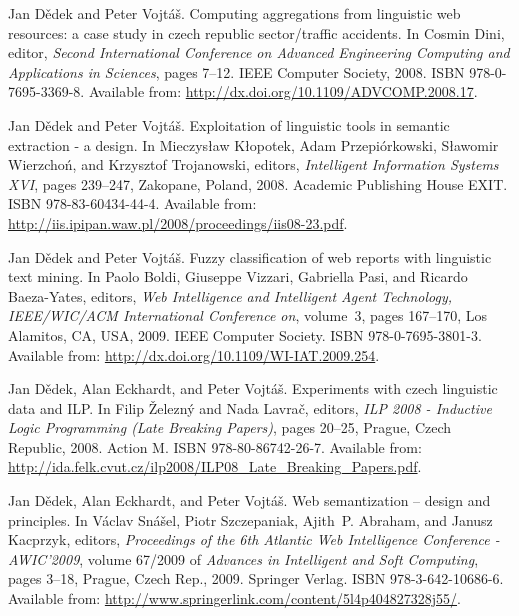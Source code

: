 \begin{description}
\item
Jan D{\v{e}}dek and Peter Vojt{\'{a}}{\v{s}}.
\newblock Computing aggregations from linguistic web resources: a case study in
  czech republic sector/traffic accidents.
\newblock In Cosmin Dini, editor, {\em Second International Conference on
  Advanced Engineering Computing and Applications in Sciences}, pages 7--12.
  {IEEE} Computer Society, 2008.
\newblock ISBN 978-0-7695-3369-8.
\newblock Available from: \url{http://dx.doi.org/10.1109/ADVCOMP.2008.17}.

\item
Jan D{\v{e}}dek and Peter Vojt{\'{a}}{\v{s}}.
\newblock Exploitation of linguistic tools in semantic extraction - a design.
\newblock In Mieczys{{\l}}aw K{{\l}}opotek, Adam Przepi{\'{o}}rkowski,
  S{{\l}}awomir Wierzcho{\'{n}}, and Krzysztof Trojanowski, editors, {\em
  Intelligent Information Systems {XVI}}, pages 239--247, Zakopane, Poland,
  2008. Academic Publishing House {EXIT}.
\newblock ISBN 978-83-60434-44-4.
\newblock Available from:
  \url{http://iis.ipipan.waw.pl/2008/proceedings/iis08-23.pdf}.


\item
Jan D{\v{e}}dek and Peter Vojt{\'{a}}{\v{s}}.
\newblock Fuzzy classification of web reports with linguistic text mining.
\newblock In Paolo Boldi, Giuseppe Vizzari, Gabriella Pasi, and Ricardo
  Baeza-Yates, editors, {\em Web Intelligence and Intelligent Agent Technology,
  IEEE/WIC/ACM International Conference on}, volume~3, pages 167--170, Los
  Alamitos, CA, USA, 2009. IEEE Computer Society.
\newblock ISBN 978-0-7695-3801-3.
\newblock Available from: \url{http://dx.doi.org/10.1109/WI-IAT.2009.254}.


\item
Jan D{\v{e}}dek, Alan Eckhardt, and Peter Vojt{\'{a}}{\v{s}}.
\newblock Experiments with czech linguistic data and {ILP}.
\newblock In Filip {\v{Z}}elezn{\'{y}} and Nada Lavra{\v{c}}, editors, {\em
  {ILP} 2008 - Inductive Logic Programming (Late Breaking Papers)}, pages
  20--25, Prague, Czech Republic, 2008. Action M.
\newblock ISBN 978-80-86742-26-7.
\newblock Available from:
  \url{http://ida.felk.cvut.cz/ilp2008/ILP08_Late_Breaking_Papers.pdf}.


\item
Jan D{\v{e}}dek, Alan Eckhardt, and Peter Vojt{\'{a}}{\v{s}}.
\newblock Web semantization -- design and principles.
\newblock In V{\'{a}}clav Sn{\'{a}}{\v{s}}el, Piotr Szczepaniak, Ajith~P.
  Abraham, and Janusz Kacprzyk, editors, {\em Proceedings of the 6th Atlantic
  Web Intelligence Conference - {AWIC}'2009}, volume 67/2009 of {\em Advances
  in Intelligent and Soft Computing}, pages 3--18, Prague, Czech Rep., 2009.
  Springer Verlag.
\newblock ISBN 978-3-642-10686-6.
\newblock Available from:
  \url{http://www.springerlink.com/content/5l4p404827328j55/}.



\end{description}
